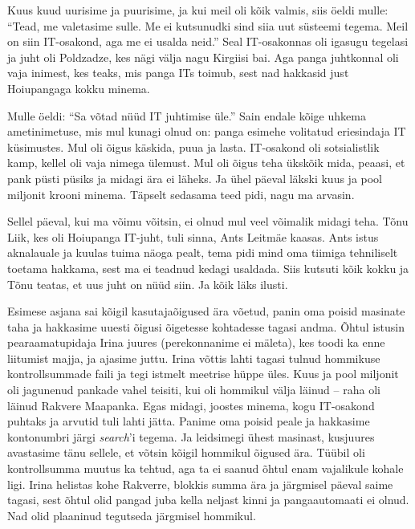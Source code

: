 Kuus kuud uurisime ja puurisime, ja kui meil oli kõik valmis, siis öeldi mulle: 
\enquote{Tead, me valetasime sulle. Me ei kutsunudki sind siia uut süsteemi 
tegema. Meil on siin IT-osakond, aga me ei usalda neid.} Seal IT-osakonnas 
oli igasugu tegelasi ja juht oli Poldzadze, kes nägi välja nagu Kirgiisi bai. Aga 
panga juhtkonnal oli vaja inimest, kes teaks, mis panga ITs toimub, sest nad 
hakkasid just Hoiupangaga kokku minema. 

Mulle öeldi: \enquote{Sa võtad nüüd IT juhtimise üle.} Sain endale kõige uhkema ametinimetuse, 
mis mul kunagi olnud on: panga esimehe 
volitatud eriesindaja IT küsimustes. Mul oli õigus käskida, puua ja lasta. 
IT-osakond oli sotsialistlik kamp, kellel oli vaja nimega ülemust. Mul oli õigus 
teha ükskõik mida, peaasi, et pank püsti püsiks ja midagi ära ei läheks. Ja 
ühel päeval läkski kuus ja pool miljonit krooni minema. Täpselt sedasama teed pidi, nagu 
ma arvasin. 

Sellel päeval, kui ma võimu võitsin, ei olnud mul veel võimalik midagi teha. 
Tõnu Liik, kes oli Hoiupanga IT-juht, tuli sinna, Ants 
Leitmäe kaasas. Ants istus aknalauale ja kuulas 
tuima näoga pealt, tema pidi mind oma tiimiga tehniliselt toetama hakkama, sest ma 
ei teadnud kedagi usaldada. Siis kutsuti kõik kokku ja Tõnu teatas, et 
uus juht on nüüd siin. Ja kõik läks ilusti. 

Esimese asjana sai kõigil 
kasutajaõigused ära võetud, panin oma poisid masinate taha ja hakkasime uuesti 
õigusi õigetesse kohtadesse tagasi andma. Õhtul istusin pearaamatupidaja Irina juures (perekonnanime ei mäleta), kes toodi ka enne liitumist majja, ja ajasime 
juttu. Irina võttis lahti tagasi tulnud hommikuse kontrollsummade faili 
ja tegi istmelt meetrise hüppe üles. Kuus ja pool miljonit oli jagunenud pankade 
vahel teisiti, kui oli hommikul välja läinud -- raha oli läinud Rakvere Maapanka. Egas midagi, 
joostes minema, kogu IT-osakond puhtaks ja arvutid tuli lahti jätta. Panime oma poisid 
peale ja hakkasime kontonumbri järgi \emph{search}'i tegema. Ja leidsimegi ühest 
masinast, kusjuures avastasime tänu sellele, et võtsin kõigil hommikul 
õigused ära. Tüübil oli kontrollsumma muutus ka tehtud, aga ta ei saanud 
õhtul enam vajalikule kohale ligi. Irina helistas kohe Rakverre, blokkis summa 
ära ja järgmisel päeval saime tagasi, sest õhtul olid pangad juba kella neljast kinni ja pangaautomaati 
ei olnud. Nad olid plaaninud tegutseda järgmisel hommikul. 

